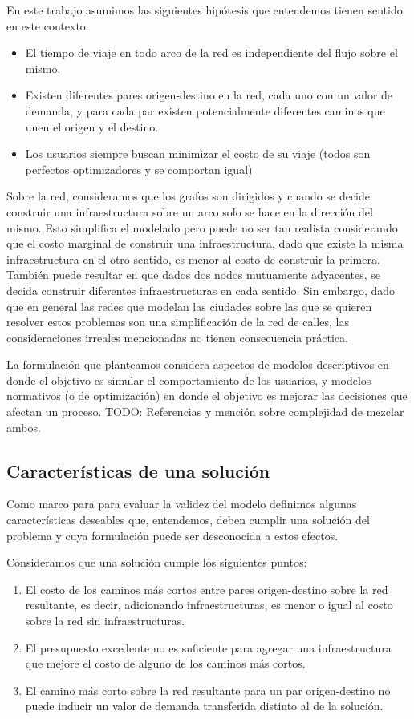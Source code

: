 \documentclass{article}
\begin{document}
  En este trabajo asumimos las siguientes hipótesis que entendemos tienen sentido en este contexto:

  \begin{itemize}
    \item{El tiempo de viaje en todo arco de la red es independiente del flujo sobre el mismo.}
    \item{Existen diferentes pares origen-destino en la red, cada uno con un valor de demanda, y para cada par existen potencialmente diferentes caminos que unen el origen y el destino.}
    \item{Los usuarios siempre buscan minimizar el costo de su viaje (todos son
    perfectos optimizadores y se comportan igual)}
  \end{itemize}

  Sobre la red, consideramos que los grafos son dirigidos y cuando se decide construir una infraestructura sobre un arco solo se hace en la dirección del mismo. Esto simplifica el modelado pero puede no ser tan realista considerando que el costo marginal de construir una infraestructura, dado que existe la misma infraestructura en el otro sentido, es menor al costo de construir la primera. También puede resultar en que dados dos nodos mutuamente adyacentes, se decida construir diferentes infraestructuras en cada sentido. Sin embargo, dado que en general las redes que modelan las ciudades sobre las que se quieren resolver estos problemas son una simplificación de la red de calles, las consideraciones irreales mencionadas no tienen consecuencia práctica.

  La formulación que planteamos considera aspectos de modelos descriptivos en donde el objetivo es simular el comportamiento de los usuarios, y modelos normativos (o de optimización) en donde el objetivo es mejorar las decisiones que afectan un proceso. TODO: Referencias y mención sobre complejidad de mezclar ambos.

  \subsection{Características de una solución}

  Como marco para para evaluar la validez del modelo definimos algunas características deseables que, entendemos, deben cumplir una solución del problema y cuya formulación puede ser desconocida a estos efectos.

  Consideramos que una solución cumple los siguientes puntos:

  \begin{enumerate}
      \item{El costo de los caminos más cortos entre pares origen-destino sobre la red resultante, es decir, adicionando infraestructuras, es menor o igual al costo sobre la red sin infraestructuras.}
    \item{\label{budgetexcess} El presupuesto excedente no es suficiente para agregar una infraestructura que mejore el costo de alguno de los caminos más cortos.}
    \item{El camino más corto sobre la red resultante para un par origen-destino no puede inducir un valor de demanda transferida distinto al de la solución.}
  \end{enumerate}
\end{document}
